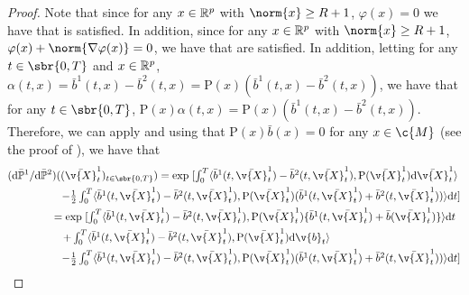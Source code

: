 \begin{proof}
	Note that since for any $x \in \mathbb{R}^p$ with $\norm{x} \geq R+1$, $\varphi(x) = 0$ we have that \cite[Equation (7.137)]{lipster2001statistics} is satisfied.
	In addition, since for any $x \in \mathbb{R}^p$ with $\norm{x} \geq R+1$, $\varphi(x) + \norm{\nabla \varphi(x)}= 0$, we have that \cite[Equation (4.110), Equation (4.111)]{lipster2001statistics} are satisfied.
	In addition, letting for any $t \in \sbr{0,T}$ and $x \in \mathbb{R}^p$, $\alpha(t,x) = \bar{b}^1(t, x) - \bar{b}^2(t, x) = \mathrm{P}(x) (\bar{b}^1(t, x) - \bar{b}^2(t, x))$, we have that for any $t \in \sbr{0,T}$, $\mathrm{P}(x) \alpha(t,x) = \mathrm{P}(x)(\bar{b}^1(t, x) - \bar{b}^2(t, x))$.
	Therefore, we can apply \cite[Section 7.6.4]{lipster2001statistics} and using that $\mathrm{P}(x) \bar{b}(x) = 0$ for any $x \in \c{M}$ (see the proof of ), we have that \begin{align}  & (\mathrm{d} \bar{\bb{P}}^1 / \mathrm{d} \bar{\bb{P}}^2)((\bar{\v{X}}_t^1)_{t \in \sbr{0,T}}) =\textstyle{ \exp\left.
              [\int_0^T \langle \bar{b}^1(t, \bar{\v{X}}_t^1) - \bar{b}^2(t, \bar{\v{X}}_t^1), \mathrm{P}(\bar{\v{X}}_t^1) \mathrm{d} \bar{\v{X}}_t^1 \rangle \right. }                                                                                                                                  \\
               & \qquad \qquad  \quad  \textstyle{ - \tfrac{1}{2} \int_0^T \langle \bar{b}^1(t, \bar{\v{X}}_t^1) - \bar{b}^2(t, \bar{\v{X}}_t^1), \mathrm{P}(\bar{\v{X}}_t^1)(\bar{b}^1(t, \bar{\v{X}}_t^1) + \bar{b}^2(t, \bar{\v{X}}_t^1)) \rangle  \mathrm{d} t ] }                                   \\
               & \qquad \qquad =\textstyle{ \exp\left.[\int_0^T \langle \bar{b}^1(t, \bar{\v{X}}_t^1)  - \bar{b}^2(t, \bar{\v{X}}_t^1), \mathrm{P}(\bar{\v{X}}_t^1) \{\bar{b}^1(t, \bar{\v{X}}_t^1) + \bar{b}(\bar{\v{X}}_t^1)\} \rangle \mathrm{d} t \right.}                                           \\
               & \qquad \qquad  \quad \textstyle{ \left. + \int_0^T \langle \bar{b}^1(t, \bar{\v{X}}_t^1) - \bar{b}^2(t, \bar{\v{X}}_t^1), \mathrm{P}(\bar{\v{X}}_t^1) \mathrm{d} \v{b}_t \rangle\right. }                                                                                               \\
               & \qquad \qquad  \quad  \textstyle{ - \tfrac{1}{2} \int_0^T \langle \bar{b}^1(t, \bar{\v{X}}_t^1) - \bar{b}^2(t, \bar{\v{X}}_t^1), \mathrm{P}(\bar{\v{X}}_t^1)(\bar{b}^1(t, \bar{\v{X}}_t^1) + \bar{b}^2(t, \bar{\v{X}}_t^1)) \rangle  \mathrm{d} t ] }                                   \\

\end{align}
\end{proof}
